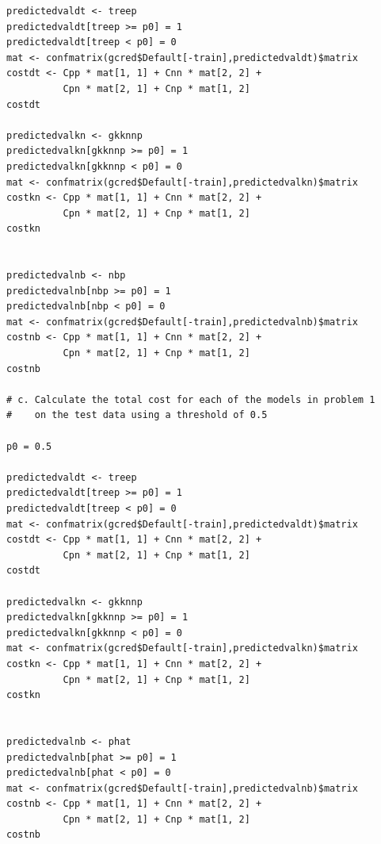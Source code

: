 \documentclass[11pt]{article}
\begin{document}
\begin{enumerate}
\begin{Verbatim}
predictedvaldt <- treep
predictedvaldt[treep >= p0] = 1
predictedvaldt[treep < p0] = 0
mat <- confmatrix(gcred$Default[-train],predictedvaldt)$matrix
costdt <- Cpp * mat[1, 1] + Cnn * mat[2, 2] + 
          Cpn * mat[2, 1] + Cnp * mat[1, 2]
costdt

predictedvalkn <- gkknnp
predictedvalkn[gkknnp >= p0] = 1
predictedvalkn[gkknnp < p0] = 0
mat <- confmatrix(gcred$Default[-train],predictedvalkn)$matrix
costkn <- Cpp * mat[1, 1] + Cnn * mat[2, 2] + 
          Cpn * mat[2, 1] + Cnp * mat[1, 2]
costkn


predictedvalnb <- nbp
predictedvalnb[nbp >= p0] = 1
predictedvalnb[nbp < p0] = 0
mat <- confmatrix(gcred$Default[-train],predictedvalnb)$matrix
costnb <- Cpp * mat[1, 1] + Cnn * mat[2, 2] + 
          Cpn * mat[2, 1] + Cnp * mat[1, 2]
costnb

# c. Calculate the total cost for each of the models in problem 1 
#    on the test data using a threshold of 0.5

p0 = 0.5

predictedvaldt <- treep
predictedvaldt[treep >= p0] = 1
predictedvaldt[treep < p0] = 0
mat <- confmatrix(gcred$Default[-train],predictedvaldt)$matrix
costdt <- Cpp * mat[1, 1] + Cnn * mat[2, 2] + 
          Cpn * mat[2, 1] + Cnp * mat[1, 2]
costdt

predictedvalkn <- gkknnp
predictedvalkn[gkknnp >= p0] = 1
predictedvalkn[gkknnp < p0] = 0
mat <- confmatrix(gcred$Default[-train],predictedvalkn)$matrix
costkn <- Cpp * mat[1, 1] + Cnn * mat[2, 2] + 
          Cpn * mat[2, 1] + Cnp * mat[1, 2]
costkn


predictedvalnb <- phat
predictedvalnb[phat >= p0] = 1
predictedvalnb[phat < p0] = 0
mat <- confmatrix(gcred$Default[-train],predictedvalnb)$matrix
costnb <- Cpp * mat[1, 1] + Cnn * mat[2, 2] + 
          Cpn * mat[2, 1] + Cnp * mat[1, 2]
costnb

\end{Verbatim}
\end{enumerate}
\end{document}
